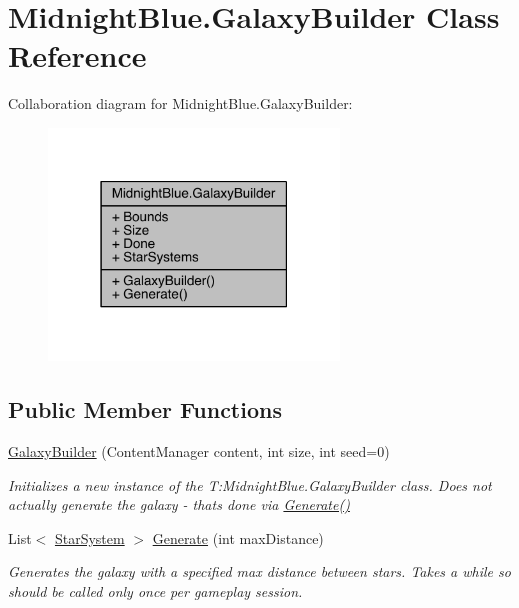 \hypertarget{class_midnight_blue_1_1_galaxy_builder}{}\section{Midnight\+Blue.\+Galaxy\+Builder Class Reference}
\label{class_midnight_blue_1_1_galaxy_builder}


Collaboration diagram for Midnight\+Blue.\+Galaxy\+Builder\+:
\nopagebreak
\begin{figure}[H]
\begin{center}
\leavevmode
\includegraphics[width=219pt]{class_midnight_blue_1_1_galaxy_builder__coll__graph}
\end{center}
\end{figure}
\subsection*{Public Member Functions}
\begin{DoxyCompactItemize}
\item 
\hyperlink{class_midnight_blue_1_1_galaxy_builder_a926e49d9c54675035304d7506c02a0b9}{Galaxy\+Builder} (Content\+Manager content, int size, int seed=0)
\begin{DoxyCompactList}\small\item\em Initializes a new instance of the T\+:\+Midnight\+Blue.\+Galaxy\+Builder class. Does not actually generate the galaxy -\/ that\textquotesingle{}s done via \hyperlink{class_midnight_blue_1_1_galaxy_builder_aaa080e0108cf02709137b7eebb56ad1a}{Generate()} \end{DoxyCompactList}\item 
List$<$ \hyperlink{class_midnight_blue_1_1_star_system}{Star\+System} $>$ \hyperlink{class_midnight_blue_1_1_galaxy_builder_aaa080e0108cf02709137b7eebb56ad1a}{Generate} (int max\+Distance)
\begin{DoxyCompactList}\small\item\em Generates the galaxy with a specified max distance between stars. Takes a while so should be called only once per gameplay session. \end{DoxyCompactList}\end{DoxyCompactItemize}
